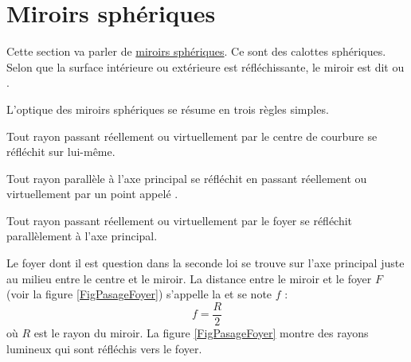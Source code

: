 
\section{Miroirs sphériques}

Cette section va parler de \href{http://fr.wikipedia.org/wiki/Miroir_sphérique}{miroirs sphériques}. Ce sont des calottes sphériques. Selon que la surface intérieure ou extérieure est réfléchissante, le miroir est dit  ou .

L'optique des miroirs sphériques se résume en trois règles simples.
\setcounter{numloiphyz}{0}		%
\begin{loiphyz}\label{PgLoiMirSph}
Tout rayon passant réellement ou virtuellement par le centre de courbure se réfléchit sur lui-même.
\end{loiphyz}

\begin{loiphyz}
Tout rayon parallèle à l'axe principal se réfléchit en passant réellement ou virtuellement par un point appelé .
\end{loiphyz}

\begin{loiphyz}
Tout rayon passant réellement ou virtuellement par le foyer se réfléchit parallèlement à l'axe principal.
\end{loiphyz}
Le foyer dont il est question dans la seconde loi se trouve sur l'axe principal juste au milieu entre le centre et le miroir. La distance entre le miroir et le foyer $F$ (voir la figure \ref{FigPasageFoyer}) s'appelle la  et se note $f$ :
\begin{equation}
  f=\frac{ R }{ 2 }
\end{equation}
où $R$ est le rayon du miroir. La figure \ref{FigPasageFoyer} montre des rayons lumineux qui sont réfléchis vers le foyer.


